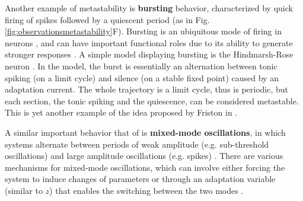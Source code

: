 \documentclass[reprint,onecolumn,superscriptaddress,showpacs,amsmath,amssymb,aps,floatfix]{revtex4-2}
\theoremstyle{definition}
\newcommand{\Emph}[1]{\textbf{#1}}
\begin{document}
Another example of metastability is \Emph{bursting} behavior, characterized by quick firing of spikes followed by a quiescent period (as in Fig. \ref{fig:observationsmetastability}F). Bursting is an ubiquitous mode of firing in neurons \cite{fox2015bursting}, and can have important functional roles due to its ability to generate stronger responses \cite{swadlow2001impact}. A simple model displaying bursting is the Hindmarsh-Rose neuron \cite{hindmarshmodel1984}. In the model, the burst is essentially an alternation between tonic spiking (on a limit cycle) and silence (on a stable fixed point) caused by an adaptation current. The whole trajectory is a limit cycle, thus is periodic, but each section, the tonic spiking and the quiescence, can be considered metastable. This is yet another example of the idea proposed by Friston in \cite{friston2000transients}.

A similar important behavior that of is \Emph{mixed-mode oscillations}, in which systems alternate between periods of weak amplitude (e.g. sub-threshold oscillations) and large amplitude oscillations (e.g. spikes) \cite{rotstein2014mixedmode}. There are various mechanisms for mixed-mode oscillations, which can involve either forcing the system to induce changes of parameters or through an adaptation variable (similar to $z$) that enables the switching between the two modes \cite{rotstein2014mixedmode}.
\end{document}
